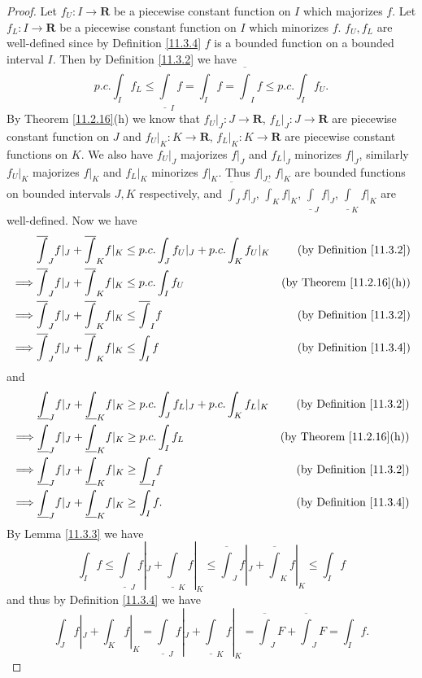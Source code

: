 \begin{proof}
    Let \(f_U : I \to \mathbf{R}\) be a piecewise constant function on \(I\) which majorizes \(f\).
    Let \(f_L : I \to \mathbf{R}\) be a piecewise constant function on \(I\) which minorizes \(f\).
    \(f_U, f_L\) are well-defined since by Definition \ref{11.3.4} \(f\) is a bounded function on a bounded interval \(I\).
    Then by Definition \ref{11.3.2} we have
    \[
        p.c. \int_I f_L \leq \underline{\int}_I f = \int_I f = \overline{\int}_I f \leq p.c. \int_I f_U.
    \]
    By Theorem \ref{11.2.16}(h) we know that \(f_U|_J : J \to \mathbf{R}\), \(f_L|_J : J \to \mathbf{R}\) are piecewise constant function on \(J\) and \(f_U|_K : K \to \mathbf{R}\), \(f_L|_K : K \to \mathbf{R}\) are piecewise constant functions on \(K\).
    We also have \(f_U|_J\) majorizes \(f|_J\) and \(f_L|_J\) minorizes \(f|_J\), similarly \(f_U|_K\) majorizes \(f|_K\) and \(f_L|_K\) minorizes \(f|_K\).
    Thus \(f|_J\), \(f|_K\) are bounded functions on bounded intervals \(J, K\) respectively, and \(\overline{\int}_J f|_J\), \(\overline{\int}_K f|_K\), \(\underline{\int}_J f|_J\), \(\underline{\int}_K f|_K\) are well-defined.
    Now we have
    \begin{align*}
                 & \overline{\int}_J f|_J + \overline{\int}_K f|_K \leq p.c. \int_J f_U|_J + p.c. \int_K f_U|_K & \text{(by Definition \ref{11.3.2})}  \\
        \implies & \overline{\int}_J f|_J + \overline{\int}_K f|_K \leq p.c. \int_I f_U                         & \text{(by Theorem \ref{11.2.16}(h))} \\
        \implies & \overline{\int}_J f|_J + \overline{\int}_K f|_K \leq \overline{\int}_I f                     & \text{(by Definition \ref{11.3.2})}  \\
        \implies & \overline{\int}_J f|_J + \overline{\int}_K f|_K \leq \int_I f                                & \text{(by Definition \ref{11.3.4})}
    \end{align*}
    and
    \begin{align*}
                 & \underline{\int}_J f|_J + \underline{\int}_K f|_K \geq p.c. \int_J f_L|_J + p.c. \int_K f_L|_K & \text{(by Definition \ref{11.3.2})}  \\
        \implies & \underline{\int}_J f|_J + \underline{\int}_K f|_K \geq p.c. \int_I f_L                         & \text{(by Theorem \ref{11.2.16}(h))} \\
        \implies & \underline{\int}_J f|_J + \underline{\int}_K f|_K \geq \underline{\int}_I f                    & \text{(by Definition \ref{11.3.2})}  \\
        \implies & \underline{\int}_J f|_J + \underline{\int}_K f|_K \geq \int_I f.                               & \text{(by Definition \ref{11.3.4})}
    \end{align*}
    By Lemma \ref{11.3.3} we have
    \[
        \int_I f \leq \underline{\int}_J f|_J + \underline{\int}_K f|_K \leq \overline{\int}_J f|_J + \overline{\int}_K f|_K \leq \int_I f
    \]
    and thus by Definition \ref{11.3.4} we have
    \[
        \int_J f|_J + \int_K f|_K = \underline{\int}_J f|_J + \underline{\int}_K f|_K = \overline{\int}_J F + \overline{\int}_J F = \int_I f.
    \]
\end{proof}

